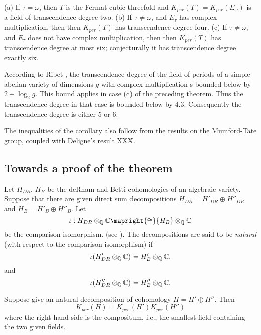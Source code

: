 \begin{corollary} (a) If $\tau = \omega$, then $T$ is the Fermat cubic threefold and
$K_{per}(T) = K_{per}(E_\omega)$ is a field of transcendence degree two. (b) If $\tau
\ne \omega$, and $E_\tau$ has complex multiplication, then then $K_{per}(T) $ has
transcendence degree four. (c) If $\tau \ne \omega$, and $E_\tau$ does not have complex
multiplication, then then $K_{per}(T) $ has transcendence degree at most six;
conjecturally it has transcendence degree exactly six. \end{corollary} 

\begin{remark} \rm {According to Ribet \cite{Ribet:DF}, the transcendence degree of the
field of periods of a simple abelian variety of dimensions $g$ with complex
multiplication s bounded below by $2 + \log_2 g$. This bound applies in case (c) of the
preceding theorem. Thus the transcendence degree in that case is bounded below by
$4.3$. Consequently the transcendence degree is either 5 or 6.}  \end{remark}

\noindent The inequalities of the corollary also follow from the results on the
Mumford-Tate group, coupled with Deligne's result XXX.


\subsection{Towards a proof of the theorem}

Let $H_{DR}$, $H_B$ be the deRham and Betti cohomologies of an algebraic variety.
Suppose that there are given direct sum decompositions $H_{DR} = H'_{DR} \oplus
H''_{DR}$ and $H_{B} = H'_{B} \oplus H''_{B}$. Let \[ \iota: {H_{DR}}\otimes_\QQ \CC
\mapright{\cong} {H_B}\otimes_\QQ \CC \] be the comparison isomorphism. (see
\cite{Deligne:HCA}). The decompositions are said to be \emph{natural} (with respect to
the comparison isomorphism) if \[ \iota( H'_{DR}\otimes_{ \mathbb Q } { \mathbb C } ) = H'_{B}\otimes_{ \mathbb Q }
{ \mathbb C } . \] and \[ \iota( H''_{DR}\otimes_{ \mathbb Q } { \mathbb C } ) = H''_{B}\otimes_{ \mathbb Q } { \mathbb C } . \]

\begin{lemma} Suppose give an natural decomposition of cohomology $H = H' \oplus H''$.
Then \[ K_{per}(H) = K_{per}(H')K_{per}(H'') \] where the right-hand side is the
compositum, i.e., the smallest field containing the two given fields. \end{lemma}

